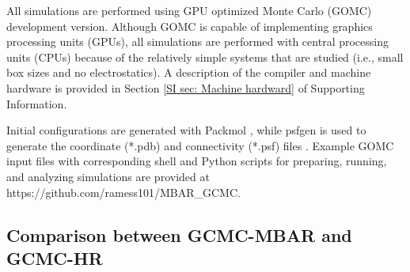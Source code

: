 \documentclass[journal=jced,manuscript=article]{achemso}
\begin{document}
All simulations are performed using GPU optimized Monte Carlo (GOMC) \cite{Nejahi2018} development version. Although GOMC is capable of implementing graphics processing units (GPUs), all simulations are performed with central processing units (CPUs) because of the relatively simple systems that are studied (i.e., small box sizes and no electrostatics). A description of the compiler and machine hardware is provided in Section \ref{SI sec: Machine hardward} of Supporting Information.



Initial configurations are generated with Packmol \cite{PACKMOL}, while psfgen is used to generate the coordinate (*.pdb) and connectivity (*.psf) files \cite{VMD}. Example GOMC input files with corresponding shell and Python scripts for preparing, running, and analyzing simulations are provided at https://github.com/ramess101/MBAR\_GCMC.



\subsection{Comparison between GCMC-MBAR and GCMC-HR} \label{sec: GCMC-HR and GCMC-MBAR}
\end{document}
